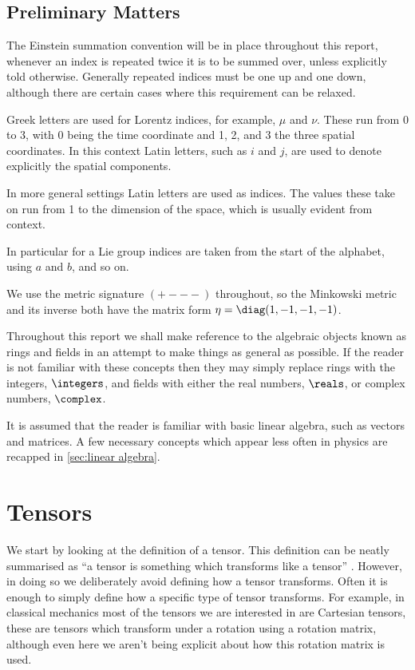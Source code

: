 \documentclass[fleqn]{NotesClass}
\newcommand{\minkowskiMetric}{\eta}
\begin{document}
    \section{Preliminary Matters}
    The Einstein summation convention will be in place throughout this report, whenever an index is repeated twice it is to be summed over, unless explicitly told otherwise.
    Generally repeated indices must be one up and one down, although there are certain cases where this requirement can be relaxed.
    
    Greek letters are used for Lorentz indices, for example, \(\mu\) and \(\nu\).
    These run from 0 to 3, with 0 being the time coordinate and 1, 2, and 3 the three spatial coordinates.
    In this context Latin letters, such as \(i\) and \(j\), are used to denote explicitly the spatial components.
    
    In more general settings Latin letters are used as indices.
    The values these take on run from 1 to the dimension of the space, which is usually evident from context.
    
    In particular for a Lie group indices are taken from the start of the alphabet, using \(a\) and \(b\), and so on.
    
    We use the metric signature \(({+}{-}{-}{-})\) throughout, so the Minkowski metric and its inverse both have the matrix form \(\minkowskiMetric = \diag(1, -1, -1, -1)\).
    
    Throughout this report we shall make reference to the algebraic objects known as rings and fields in an attempt to make things as general as possible.
    If the reader is not familiar with these concepts then they may simply replace rings with the integers, \(\integers\), and fields with either the real numbers, \(\reals\), or complex numbers, \(\complex\).
    
    It is assumed that the reader is familiar with basic linear algebra, such as vectors and matrices.
    A few necessary concepts which appear less often in physics are recapped in \cref{sec:linear algebra}.
    
    \chapter{Tensors}
    We start by looking at the definition of a tensor.
    This definition can be neatly summarised as \enquote{a tensor is something which transforms like a tensor} \cite[52]{zee}.
    However, in doing so we deliberately avoid defining how a tensor transforms.
    Often it is enough to simply define how a specific type of tensor transforms.
    For example, in classical mechanics most of the tensors we are interested in are Cartesian tensors, these are tensors which transform under a rotation using a rotation matrix, although even here we aren't being explicit about how this rotation matrix is used.
    
\end{document}
